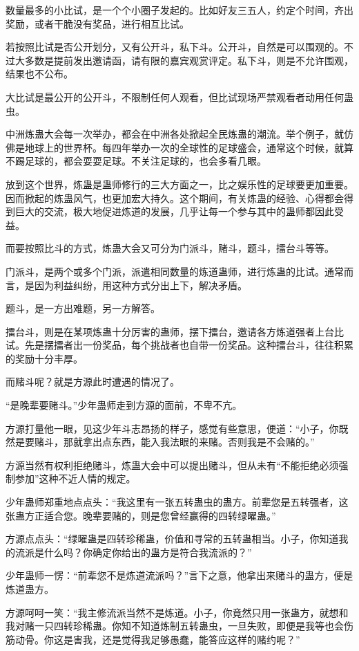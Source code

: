 \begin{this_body}
数量最多的小比试，是一个个小圈子发起的。比如好友三五人，约定个时间，齐出奖励，或者干脆没有奖品，进行相互比试。

若按照比试是否公开划分，又有公开斗，私下斗。公开斗，自然是可以围观的。不过大多数是提前发出邀请函，请有限的嘉宾观赏评定。私下斗，则是不允许围观，结果也不公布。

大比试是最公开的公开斗，不限制任何人观看，但比试现场严禁观看者动用任何蛊虫。

中洲炼蛊大会每一次举办，都会在中洲各处掀起全民炼蛊的潮流。举个例子，就仿佛是地球上的世界杯。每四年举办一次的全球性的足球盛会，通常这个时候，就算不踢足球的，都会耍耍足球。不关注足球的，也会多看几眼。

放到这个世界，炼蛊是蛊师修行的三大方面之一，比之娱乐性的足球要更加重要。因而掀起的炼蛊风气，也更加宏大持久。这个期间，有关炼蛊的经验、心得都会得到巨大的交流，极大地促进炼道的发展，几乎让每一个参与其中的蛊师都因此受益。

而要按照比斗的方式，炼蛊大会又可分为门派斗，赌斗，题斗，擂台斗等等。

门派斗，是两个或多个门派，派遣相同数量的炼道蛊师，进行炼蛊的比试。通常而言，是因为利益纠纷，用这种方式分出上下，解决矛盾。

题斗，是一方出难题，另一方解答。

擂台斗，则是在某项炼蛊十分厉害的蛊师，摆下擂台，邀请各方炼道强者上台比试。先是摆擂者出一份奖品，每个挑战者也自带一份奖品。这种擂台斗，往往积累的奖励十分丰厚。

而赌斗呢？就是方源此时遭遇的情况了。

“是晚辈要赌斗。”少年蛊师走到方源的面前，不卑不亢。

方源打量他一眼，见这少年斗志昂扬的样子，感觉有些意思，便道：“小子，你既然是要赌斗，那就拿出点东西，能入我法眼的来赌。否则我是不会赌的。”

方源当然有权利拒绝赌斗，炼蛊大会中可以提出赌斗，但从未有“不能拒绝必须强制参加”这种不近人情的规定。

少年蛊师郑重地点点头：“我这里有一张五转蛊虫的蛊方。前辈您是五转强者，这张蛊方正适合您。晚辈要赌的，则是您曾经赢得的四转绿曜蛊。”

方源点点头：“绿曜蛊是四转珍稀蛊，价值和寻常的五转蛊相当。小子，你知道我的流派是什么吗？你确定你给出的蛊方是符合我流派的？”

少年蛊师一愣：“前辈您不是炼道流派吗？”言下之意，他拿出来赌斗的蛊方，便是炼道蛊方。

方源呵呵一笑：“我主修流派当然不是炼道。小子，你竟然只用一张蛊方，就想和我对赌一只四转珍稀蛊。你知不知道炼制五转蛊虫，一旦失败，即便是我等也会伤筋动骨。你这是害我，还是觉得我足够愚蠢，能答应这样的赌约呢？”


\end{this_body}
